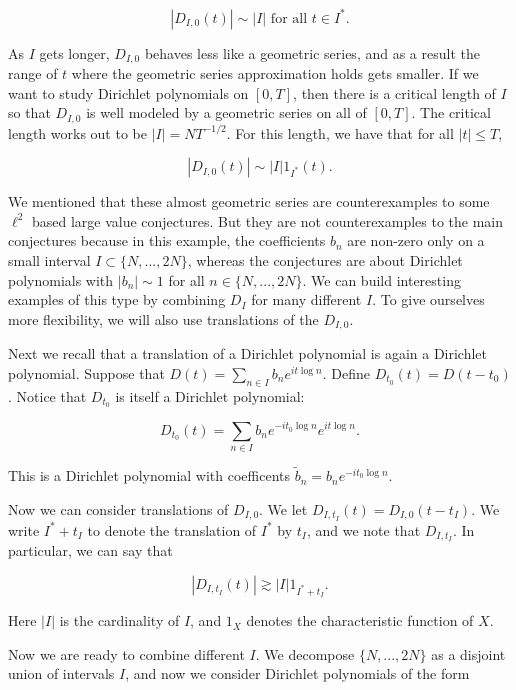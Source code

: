 \documentclass{amsart}
\begin{document}
$$ | D_{I,0}(t) | \sim |I| \textrm{ for all } t \in I^*. $$

As $I$ gets longer,  $D_{I,0}$ behaves less like a geometric series,  and as a result the range of $t$ where the geometric series approximation holds gets smaller.   If we want to study Dirichlet polynomials on $[0,T]$,  then there is a critical length of $I$ so that $D_{I,0}$ is well modeled by a geometric series on all of $[0,T]$.  The critical length works out to be $|I| = N T^{-1/2}$.   For this length,  we have that for all $|t| \le T$,

$$ | D_{I,0}(t) | \sim |I| 1_{I^*}(t). $$


We mentioned that these almost geometric series are counterexamples to some $\ell^2$ based large value conjectures.   But they are not counterexamples to the main conjectures because in this example,  the coefficients $b_n$ are non-zero only on a small interval $I \subset \{ N, ..., 2N\}$,  whereas the conjectures are about Dirichlet polynomials with $|b_n| \sim 1$ for all $n \in \{N, ..., 2N \}$.   We can build interesting examples of this type by combining $D_I$ for many different $I$.    To give ourselves more flexibility,  we will also use translations of the $D_{I,0}$.   

Next we recall that a translation of a Dirichlet polynomial is again a Dirichlet polynomial.   Suppose that $D(t) = \sum_{n \in I} b_n e^{i t \log n}$.    Define $D_{t_0} (t) = D(t - t_0)$.   Notice that $D_{t_0}$ is itself a Dirichlet polynomial:

$$ D_{t_0} (t)  = \sum_{n \in I} b_n e^{- i t_0 \log n} e^{i t \log n}. $$

\noindent This is a Dirichlet polynomial with coefficents $\tilde b_n = b_n e^{-i t_0 \log n}$.    

Now we can consider translations of $D_{I,0}$.   We let $D_{I, t_I}(t) = D_{I,0}(t-t_I)$.   We write $I^* + t_I$ to denote the translation of $I^*$ by $t_I$, and we note that $D_{I,t_I}$.  In particular, we can say that

$$ | D_{I, t_I}(t)| \gtrsim |I| 1_{I^* + t_I}. $$

\noindent Here $|I|$ is the cardinality of $I$,  and $1_X$ denotes the characteristic function of $X$.

Now we are ready to combine different $I$.   We decompose $\{ N, ..., 2N\}$ as a disjoint union of intervals $I$, and now we consider Dirichlet polynomials of the form
\end{document}
